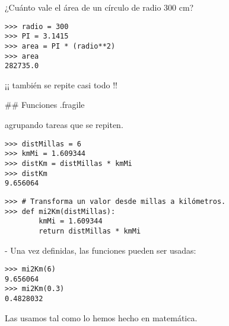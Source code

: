 \pause

\vspace{1ex}
\bgncolumns


\bgnblocknormal[wd=.7\textwidth,centered=true]
¿Cuánto vale el área de un círculo de radio 300 cm?
\trmblocknormal

\vspace{-2ex}
\begin{lstlisting}[linebackgroundcolor={\btLstHL<3->{2-3}}]
>>> radio = 300
>>> PI = 3.1415
>>> area = PI * (radio**2)
>>> area
282735.0
\end{lstlisting}

\trmcolumns

\pause

\bgnblockdanger
¡¡ también se repite casi todo !!
\trmblockdanger

## Funciones {.fragile}

\bgnblocknormal[wd=.8\textwidth,centered=true]
 agrupando tareas que se repiten.
\trmblocknormal

\bgncolumns


\begin{lstlisting}
>>> distMillas = 6
>>> kmMi = 1.609344
>>> distKm = distMillas * kmMi
>>> distKm
9.656064
\end{lstlisting}


\begin{lstlisting}[style=frame01]
>>> # Transforma un valor desde millas a kilómetros.
>>> def mi2Km(distMillas):
        kmMi = 1.609344
        return distMillas * kmMi
\end{lstlisting}

\trmcolumns

\pause

- Una vez definidas, las funciones pueden ser usadas:

\bgncolumns


\begin{lstlisting}
>>> mi2Km(6)
9.656064
>>> mi2Km(0.3)
0.4828032
\end{lstlisting}


\bgnblocknormal[wd=.9\textwidth,centered=true]
Las usamos tal como lo hemos hecho en matemática.
\trmblocknormal

